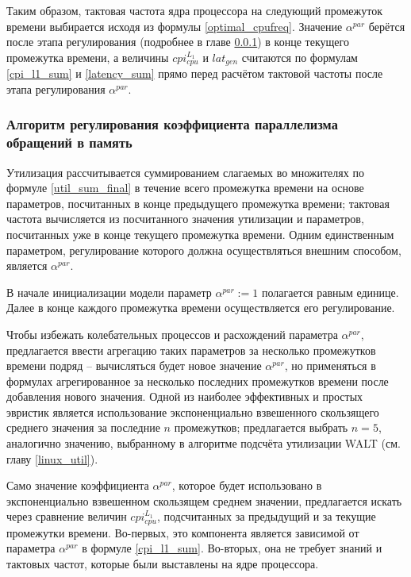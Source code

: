     Таким образом, тактовая частота ядра процессора на следующий промежуток времени выбирается исходя
    из формулы \eqref{optimal_cpufreq}. Значение $\alpha^{par}$ берётся после этапа регулирования
    (подробнее в главе \ref{alpha_regul}) в конце текущего промежутка времени, а величины
    $cpi_{cpu}^{L_1}$ и $lat_{gen}$ считаются по формулам \eqref{cpi_l1_sum} и \eqref{latency_sum}
    прямо перед расчётом тактовой частоты после этапа регулирования $\alpha^{par}$.

\subsubsection{Алгоритм регулирования коэффициента параллелизма обращений в память} \label{alpha_regul}

    Утилизация рассчитывается суммированием слагаемых во множителях по формуле \eqref{util_sum_final}
    в течение всего промежутка времени на основе параметров, посчитанных в конце предыдущего промежутка
    времени; тактовая частота вычисляется из посчитанного значения утилизации и параметров, посчитанных
    уже в конце текущего промежутка времени. Одним единственным параметром, регулирование которого должна
    осуществляться внешним способом, является $\alpha^{par}$.

    В начале инициализации модели параметр $\alpha^{par} := 1$ полагается равным единице. Далее в конце
    каждого промежутка времени осуществляется его регулирование.

    Чтобы избежать колебательных процессов и расхождений параметра $\alpha^{par}$, предлагается
    ввести агрегацию таких параметров за несколько промежутков времени подряд -- вычисляться будет
    новое значение $\alpha^{par}$, но применяться в формулах агрегированное за несколько последних
    промежутков времени после добавления нового значения. Одной из наиболее эффективных и простых
    эвристик является использование экспоненциально взвешенного скользящего среднего значения за
    последние $n$ промежутков; предлагается выбрать $n = 5$, аналогично значению, выбранному в алгоритме
    подсчёта утилизации WALT (см. главу \ref{linux_util}).

    Само значение коэффициента $\alpha^{par}$, которое будет использовано в экспоненциально взвешенном
    скользящем среднем значении, предлагается искать через сравнение величин $cpi_{cpu}^{L_1}$,
    подсчитанных за предыдущий и за текущие промежутки времени. Во-первых, это компонента является
    зависимой от параметра $\alpha^{par}$ в формуле \eqref{cpi_l1_sum}. Во-вторых, она не требует
    знаний и тактовых частот, которые были выставлены на ядре процессора.

